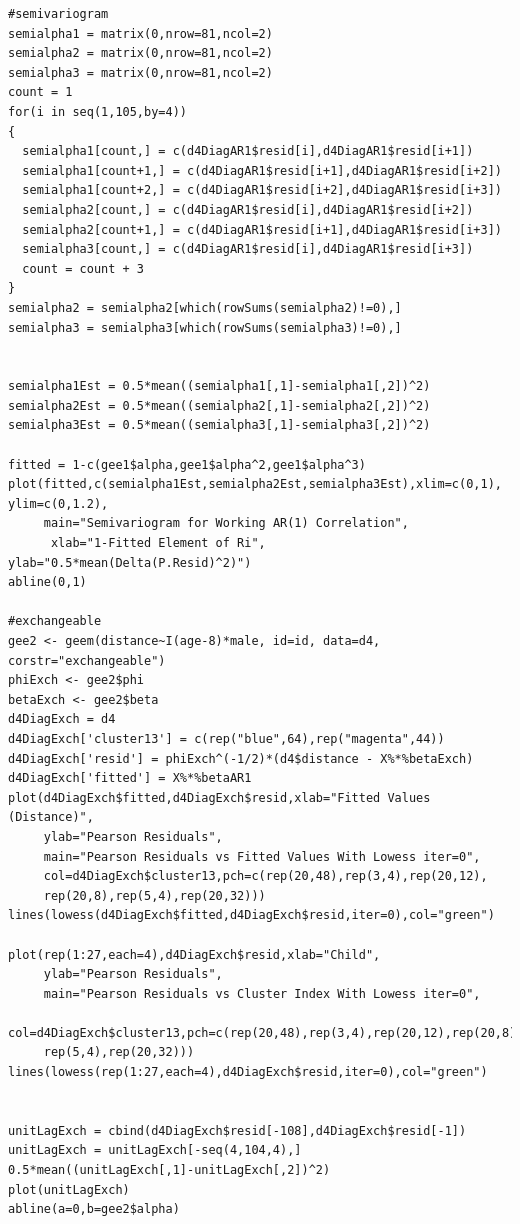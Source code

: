 \documentclass[11pt]{article}
\begin{document}
\begin{verbatim}
#semivariogram
semialpha1 = matrix(0,nrow=81,ncol=2) 
semialpha2 = matrix(0,nrow=81,ncol=2)
semialpha3 = matrix(0,nrow=81,ncol=2)
count = 1
for(i in seq(1,105,by=4))
{
  semialpha1[count,] = c(d4DiagAR1$resid[i],d4DiagAR1$resid[i+1])
  semialpha1[count+1,] = c(d4DiagAR1$resid[i+1],d4DiagAR1$resid[i+2])
  semialpha1[count+2,] = c(d4DiagAR1$resid[i+2],d4DiagAR1$resid[i+3])
  semialpha2[count,] = c(d4DiagAR1$resid[i],d4DiagAR1$resid[i+2])
  semialpha2[count+1,] = c(d4DiagAR1$resid[i+1],d4DiagAR1$resid[i+3])
  semialpha3[count,] = c(d4DiagAR1$resid[i],d4DiagAR1$resid[i+3])
  count = count + 3
}
semialpha2 = semialpha2[which(rowSums(semialpha2)!=0),]
semialpha3 = semialpha3[which(rowSums(semialpha3)!=0),]


semialpha1Est = 0.5*mean((semialpha1[,1]-semialpha1[,2])^2)
semialpha2Est = 0.5*mean((semialpha2[,1]-semialpha2[,2])^2)
semialpha3Est = 0.5*mean((semialpha3[,1]-semialpha3[,2])^2)

fitted = 1-c(gee1$alpha,gee1$alpha^2,gee1$alpha^3)
plot(fitted,c(semialpha1Est,semialpha2Est,semialpha3Est),xlim=c(0,1),
ylim=c(0,1.2),
     main="Semivariogram for Working AR(1) Correlation",
      xlab="1-Fitted Element of Ri", ylab="0.5*mean(Delta(P.Resid)^2)")
abline(0,1)

#exchangeable
gee2 <- geem(distance~I(age-8)*male, id=id, data=d4, corstr="exchangeable")
phiExch <- gee2$phi
betaExch <- gee2$beta
d4DiagExch = d4
d4DiagExch['cluster13'] = c(rep("blue",64),rep("magenta",44))
d4DiagExch['resid'] = phiExch^(-1/2)*(d4$distance - X%*%betaExch)
d4DiagExch['fitted'] = X%*%betaAR1
plot(d4DiagExch$fitted,d4DiagExch$resid,xlab="Fitted Values (Distance)",
     ylab="Pearson Residuals", 
     main="Pearson Residuals vs Fitted Values With Lowess iter=0",
     col=d4DiagExch$cluster13,pch=c(rep(20,48),rep(3,4),rep(20,12),
     rep(20,8),rep(5,4),rep(20,32)))
lines(lowess(d4DiagExch$fitted,d4DiagExch$resid,iter=0),col="green")

plot(rep(1:27,each=4),d4DiagExch$resid,xlab="Child",
     ylab="Pearson Residuals", 
     main="Pearson Residuals vs Cluster Index With Lowess iter=0",
     col=d4DiagExch$cluster13,pch=c(rep(20,48),rep(3,4),rep(20,12),rep(20,8),
     rep(5,4),rep(20,32)))
lines(lowess(rep(1:27,each=4),d4DiagExch$resid,iter=0),col="green")


unitLagExch = cbind(d4DiagExch$resid[-108],d4DiagExch$resid[-1])
unitLagExch = unitLagExch[-seq(4,104,4),]
0.5*mean((unitLagExch[,1]-unitLagExch[,2])^2)
plot(unitLagExch)
abline(a=0,b=gee2$alpha)





\end{verbatim}
\end{document}
